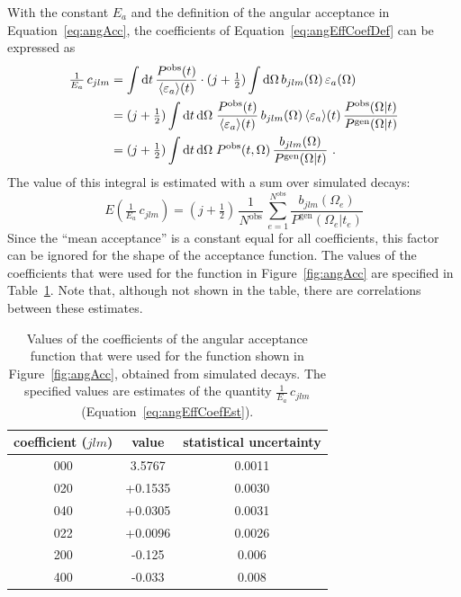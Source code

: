 With the constant $E_a$ and the definition of the angular acceptance in Equation~\ref{eq:angAcc}, the coefficients of
Equation~\ref{eq:angEffCoefDef} can be expressed as
\begin{equation}
  \label{eq:angAccInt}
  \begin{split}
    \tfrac{1}{E_a}\, c_{jlm} &= \int\mathrm{d} t\, \frac{P^\text{obs}(t)}{\langle\varepsilon_a\rangle(t)}
                                \cdot (j+\tfrac{1}{2}) \int\mathrm{d}\Omega\,b_{jlm}(\Omega)\, \varepsilon_a(\Omega) \\
                             &= (j+\tfrac{1}{2}) \int\mathrm{d} t\, \mathrm{d}\Omega\; \frac{P^\text{obs}(t)}{\langle\varepsilon_a\rangle(t)}\,
                                b_{jlm}(\Omega)\, \langle\varepsilon_a\rangle(t)\, \frac{P^\text{obs}(\Omega|t)}{P^\text{gen}(\Omega|t)} \\
                             &= (j+\tfrac{1}{2}) \int\mathrm{d} t\, \mathrm{d}\Omega\; P^\text{obs}(t,\Omega)\,
                                \frac{b_{jlm}(\Omega)}{P^\text{gen}(\Omega|t)} \ .
  \end{split}
\end{equation}
The value of this integral is estimated with a sum over simulated decays:
\begin{equation}
  E\left( \tfrac{1}{E_a}\, c_{jlm} \right)
      = (j + \tfrac{1}{2})\, \frac{1}{N^\text{obs}}\, \sum_{e=1}^{N^\text{obs}}\frac{b_{jlm}(\Omega_e)}{P^\text{gen}(\Omega_e|t_e)}
  \label{eq:angEffCoefEst}
\end{equation}
Since the ``mean acceptance'' is a constant equal for all coefficients, this factor can be ignored for the shape of the acceptance
function. The values of the coefficients that were used for the function in Figure~\ref{fig:angAcc} are specified in
Table~\ref{tab:angEffCoefs}. Note that, although not shown in the table, there are correlations between these estimates.
\begin{table}[htbp]
  \centering
  \caption{Values of the coefficients of the angular acceptance function that were used for the function shown in Figure~\ref{fig:angAcc},
           obtained from simulated \BstoJpsiKK{} decays.
           The specified values are estimates of the quantity $\tfrac{1}{E_a}\, c_{jlm}$ (Equation~\ref{eq:angEffCoefEst}).}
  \label{tab:angEffCoefs}
  \begin{tabular}{ccc}
    \hline
    coefficient ($jlm$)  &  value  &  statistical uncertainty  \\
    \hline
    000  &   3.5767  &  0.0011  \\
    020  &  +0.1535  &  0.0030  \\
    040  &  +0.0305  &  0.0031  \\
    022  &  +0.0096  &  0.0026  \\
    200  &  -0.125   &  0.006   \\
    400  &  -0.033   &  0.008   \\
    \hline
  \end{tabular}
\end{table}

